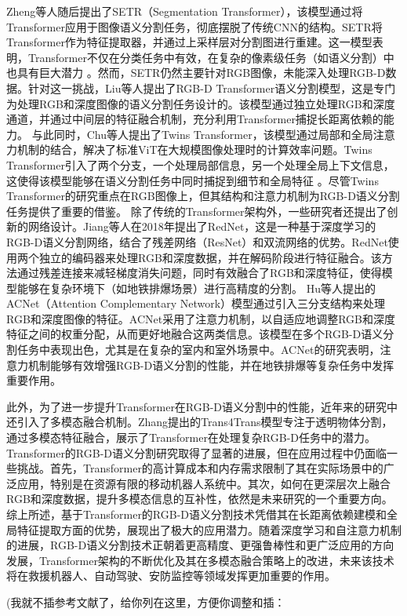 Zheng等人随后提出了SETR（Segmentation Transformer），该模型通过将Transformer应用于图像语义分割任务，彻底摆脱了传统CNN的结构。SETR将Transformer作为特征提取器，并通过上采样层对分割图进行重建。这一模型表明，Transformer不仅在分类任务中有效，在复杂的像素级任务（如语义分割）中也具有巨大潜力 。然而，SETR仍然主要针对RGB图像，未能深入处理RGB-D数据。针对这一挑战，Liu等人提出了RGB-D Transformer语义分割模型，这是专门为处理RGB和深度图像的语义分割任务设计的。该模型通过独立处理RGB和深度通道，并通过中间层的特征融合机制，充分利用Transformer捕捉长距离依赖的能力。
与此同时，Chu等人提出了Twins Transformer，该模型通过局部和全局注意力机制的结合，解决了标准ViT在大规模图像处理时的计算效率问题。Twins Transformer引入了两个分支，一个处理局部信息，另一个处理全局上下文信息，这使得该模型能够在语义分割任务中同时捕捉到细节和全局特征 。尽管Twins Transformer的研究重点在RGB图像上，但其结构和注意力机制为RGB-D语义分割任务提供了重要的借鉴。
除了传统的Transformer架构外，一些研究者还提出了创新的网络设计。Jiang等人在2018年提出了RedNet，这是一种基于深度学习的RGB-D语义分割网络，结合了残差网络（ResNet）和双流网络的优势。RedNet使用两个独立的编码器来处理RGB和深度数据，并在解码阶段进行特征融合。该方法通过残差连接来减轻梯度消失问题，同时有效融合了RGB和深度特征，使得模型能够在复杂环境下（如地铁排爆场景）进行高精度的分割。
Hu等人提出的ACNet（Attention Complementary Network）模型通过引入三分支结构来处理RGB和深度图像的特征。ACNet采用了注意力机制，以自适应地调整RGB和深度特征之间的权重分配，从而更好地融合这两类信息。该模型在多个RGB-D语义分割任务中表现出色，尤其是在复杂的室内和室外场景中。ACNet的研究表明，注意力机制能够有效增强RGB-D语义分割的性能，并在地铁排爆等复杂任务中发挥重要作用。

此外，为了进一步提升Transformer在RGB-D语义分割中的性能，近年来的研究中还引入了多模态融合机制。Zhang提出的Trans4Trans模型专注于透明物体分割，通过多模态特征融合，展示了Transformer在处理复杂RGB-D任务中的潜力。Transformer的RGB-D语义分割研究取得了显著的进展，但在应用过程中仍面临一些挑战。首先，Transformer的高计算成本和内存需求限制了其在实际场景中的广泛应用，特别是在资源有限的移动机器人系统中。其次，如何在更深层次上融合RGB和深度数据，提升多模态信息的互补性，依然是未来研究的一个重要方向。
综上所述，基于Transformer的RGB-D语义分割技术凭借其在长距离依赖建模和全局特征提取方面的优势，展现出了极大的应用潜力。随着深度学习和自注意力机制的进展，RGB-D语义分割技术正朝着更高精度、更强鲁棒性和更广泛应用的方向发展，Transformer架构的不断优化及其在多模态融合策略上的改进，未来该技术将在救援机器人、自动驾驶、安防监控等领域发挥更加重要的作用。


(我就不插参考文献了，给你列在这里，方便你调整和插：

